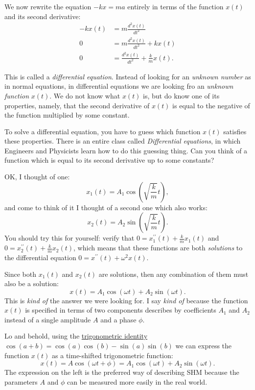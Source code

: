 \documentclass[letterpaper,9pt,journal]{IEEEtran}
\newcommand{\dokuitalic}[1]{\textsl{#1}}
\begin{document}
We now rewrite the equation $-kx = ma$ entirely in terms of the function $x(t)$ and its second derivative:
\begin{align*}
 -kx(t) &= m\frac{d^2x(t)}{dt^2} \\
 0 & = m\frac{d^2x(t)}{dt^2}+ kx(t) \\
 0 & = \frac{d^2x(t)}{dt^2}+ \frac{k}{m}x(t).
\end{align*}

This is called a \dokuitalic{differential equation}.
Instead of looking for an \dokuitalic{unknown number} as in normal equations,
in differential equations we are looking fro an \dokuitalic{unknown function} $x(t)$. 
We do not know what $x(t)$ is, but do know one of its properties, 
namely, that the second derivative of $x(t)$ is equal to 
the negative of the function multiplied by some constant.

To solve a differential equation, 
you have to guess which function $x(t)$ satisfies these properties.
There is an entire class called \dokuitalic{Differential equations}, in which Engineers
and Physicists learn how to do this guessing thing.
Can you think of a function which is equal to its second derivative up to some constants?


OK, I thought of one:
\[
 x_1(t)=A_1 \cos\!\left( \sqrt{ \frac{k}{m}}t \right),
\]
and come to think of it I thought of a second one which also works:
\[
 x_2(t)=A_2 \sin\!\left( \sqrt{ \frac{k}{m}}t \right).
\]
You should try this for yourself: verify that $0=x^{\prime\prime}_1(t) + \frac{k}{m}x_1(t)$
and $0= x^{\prime\prime}_2(t) + \frac{k}{m}x_2(t)$, 
which means that these functions are both \dokuitalic{solutions} to the differential equation
$0 = x^{\prime\prime}(t)+\omega^2 x(t)$.

Since both $x_1(t)$ and $x_2(t)$ are solutions, then any combination of them must
also be a solution:
\[
 x(t) = A_1\cos(\omega t) + A_2\sin(\omega t).
\]
This is \dokuitalic{kind of} the answer we were looking for. 
I say \dokuitalic{kind of} because the function $x(t)$ is specified in terms of two components 
describes by coefficients $A_1$ and $A_2$ instead of a single amplitude 
$A$ and a phase $\phi$.

Lo and behold, using the \hyperref[dfc96c1062532291f8378374353a33c7]{trigonometric identity}
$\cos(a + b)=\cos(a)\cos(b) - \sin(a)\sin(b)$
we can express the function $x(t)$ as a time-shifted trigonometric function:
\[
 x(t)=A\cos(\omega t   + \phi) = A_1\cos(\omega t) + A_2\sin(\omega t).
\]
The expression on the left is the preferred way of describing SHM
because the parameters $A$ and $\phi$ can be measured more easily in the real world.
\end{document}

